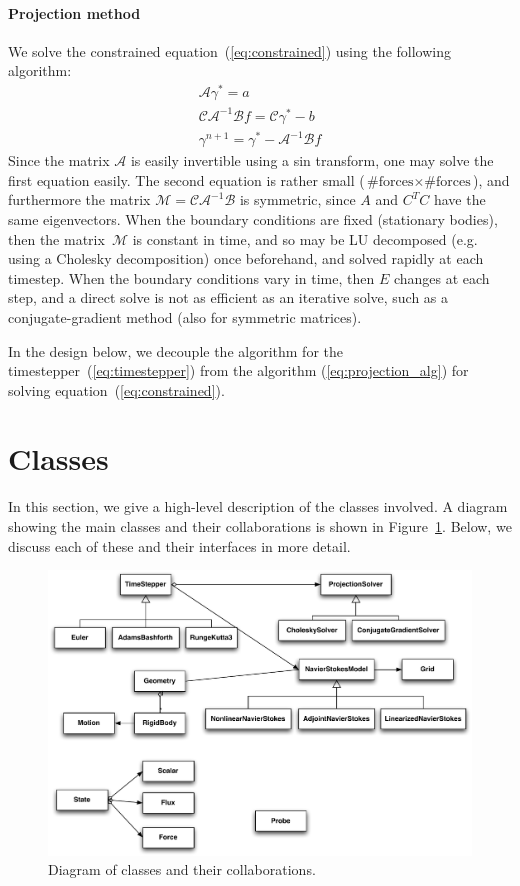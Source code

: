 \documentclass[11pt]{article}
\begin{document}
\paragraph{Projection method}
We solve the constrained equation~(\ref{eq:constrained}) using the following algorithm:
\begin{equation}
\begin{aligned}
	\mathcal{A}\gamma^* = a\\
	\mathcal{CA}^{-1}\mathcal{B}f = \mathcal{C}\gamma^* - b\\
	\gamma^{n+1} = \gamma^* - \mathcal{A}^{-1}\mathcal{B}f
\end{aligned}
\label{eq:projection_alg}
\end{equation}
Since the matrix $\mathcal{A}$ is easily invertible using a sin transform, one may solve the first equation easily.  The second equation is rather small ($\text{\#forces} \times \text{\#forces}$), and furthermore the matrix $\mathcal{M}=\mathcal{C}\mathcal{A}^{-1}\mathcal{B}$ is symmetric, since $A$ and $C^TC$ have the same eigenvectors.  When the boundary conditions are fixed (stationary bodies), then the matrix~$\mathcal{M}$ is constant in time, and so may be LU decomposed (e.g. using a Cholesky decomposition) once beforehand, and solved rapidly at each timestep.  When the boundary conditions vary in time, then $E$ changes at each step, and a direct solve is not as efficient as an iterative solve, such as a conjugate-gradient method (also for symmetric matrices).

In the design below, we decouple the algorithm for the timestepper~(\ref{eq:timestepper}) from the algorithm (\ref{eq:projection_alg}) for solving equation~(\ref{eq:constrained}).

\section{Classes}
In this section, we give a high-level description of the classes involved.  A diagram showing the main classes and their collaborations is shown in Figure~\ref{fig:class_diagram}.  Below, we discuss each of these and their interfaces in more detail.

\begin{figure}
\centering
\includegraphics[width=0.95\linewidth]{IBFSDesign}
\caption{Diagram of classes and their collaborations.}
\label{fig:class_diagram}
\end{figure}
\end{document}
